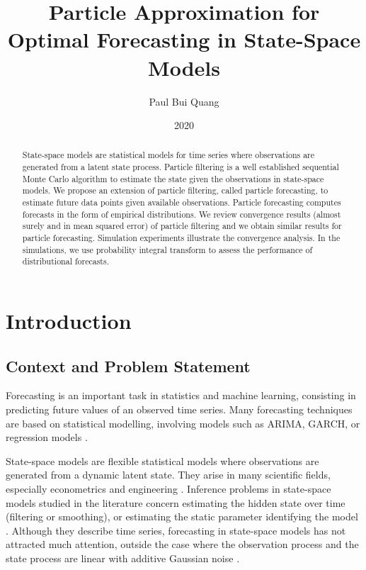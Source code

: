 \documentclass{article}
\title{Particle Approximation for Optimal Forecasting in State-Space Models}
\author{Paul Bui Quang}
\date{2020}
\begin{document}
\maketitle

\begin{abstract}
State-space models are statistical models for time series where observations are generated from a latent state process. Particle filtering is a well established sequential Monte Carlo algorithm to estimate the state given the observations in state-space models. We propose an extension of particle filtering, called particle forecasting, to estimate future data points given available observations. Particle forecasting computes forecasts in the form of empirical distributions. We review convergence results (almost surely and in mean squared error) of particle filtering and we obtain similar results for particle forecasting. Simulation experiments illustrate the convergence analysis. In the simulations, we use probability integral transform to assess the performance of distributional forecasts.
\end{abstract}

\section{Introduction}

\subsection{Context and Problem Statement}

Forecasting is an important task in statistics and machine learning, consisting in predicting future values of an observed time series. Many forecasting techniques are based on statistical modelling, involving models such as ARIMA, GARCH, or regression models \cite{Hyndman2018}.

State-space models are flexible statistical models where observations are generated from a dynamic latent state. They arise in many scientific fields, especially econometrics \cite{Taylor1986} and engineering \cite{BuiQuang2016,Gustafsson2002}. Inference problems in state-space models studied in the literature concern estimating the hidden state over time (filtering or smoothing), or estimating the static parameter identifying the model \cite{Cappe2005,Kantas2015,Sarkka2013}. 
Although they describe time series, forecasting in state-space models has not attracted much attention, outside the case where the observation process and the state process are linear with additive Gaussian noise \cite{Petris2009}.
\end{document}

